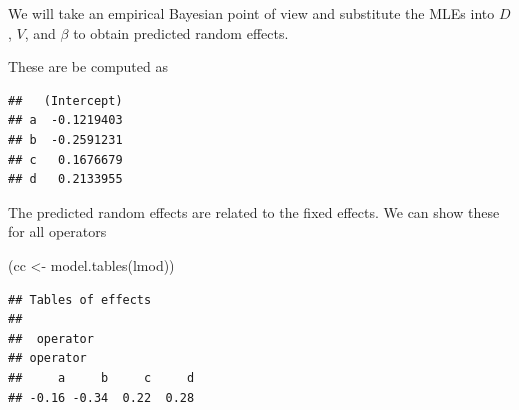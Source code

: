 \documentclass[
  ignorenonframetext,
]{beamer}
\newenvironment{Shaded}{\begin{snugshade}}{\end{snugshade}}
\newcommand{\FunctionTok}[1]{\textcolor[rgb]{0.00,0.00,0.00}{#1}}
\newcommand{\NormalTok}[1]{#1}
\newcommand{\OtherTok}[1]{\textcolor[rgb]{0.56,0.35,0.01}{#1}}
\newcommand{\SpecialCharTok}[1]{\textcolor[rgb]{0.00,0.00,0.00}{#1}}
\begin{document}
\begin{frame}[fragile]{}
\protect\hypertarget{section-7}{}
We will take an empirical Bayesian point of view and substitute the MLEs
into \(D\), \(V\), and \(\beta\) to obtain predicted random effects.

These are be computed as

\vspace{12pt}
\tiny

\begin{Shaded}
\end{Shaded}

\begin{verbatim}
##   (Intercept)
## a  -0.1219403
## b  -0.2591231
## c   0.1676679
## d   0.2133955
\end{verbatim}

\vspace{12pt}
\normalsize

The predicted random effects are related to the fixed effects. We can
show these for all operators

\vspace{12pt}
\tiny

\begin{Shaded}
\begin{Highlighting}[]
\NormalTok{(cc }\OtherTok{\textless{}{-}} \FunctionTok{model.tables}\NormalTok{(lmod))}
\end{Highlighting}
\end{Shaded}

\begin{verbatim}
## Tables of effects
## 
##  operator 
## operator
##     a     b     c     d 
## -0.16 -0.34  0.22  0.28
\end{verbatim}
\end{frame}
\end{document}

